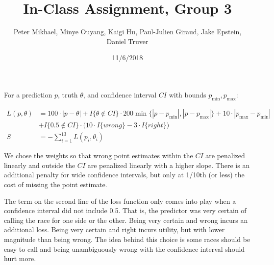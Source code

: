\documentclass[]{article}
\title{In-Class Assignment, Group 3}
\author{Peter Mikhael, Minye Ouyang, Kaigi Hu, Paul-Julien Giraud, Jake Epstein,
Daniel Truver}
\date{11/6/2018}
\begin{document}
\maketitle

For a prediction \(p\), truth \(\theta\), and confidence interval \(CI\)
with bounds \(p_\min, p_\max\):

\[
\begin{aligned}
L(p, \theta) &=
100\cdot|p-\theta| + I\{\theta\notin CI\}\cdot200\min\{|p-p_\min|,|p-p_\max|\} + 10\cdot|p_\max-p_\min|\\& + I\{0.5\notin CI\}\cdot\big(10\cdot I\{wrong\} - 3\cdot I\{right\}\big)  \\
S &= -\sum_{i=1}^{13} L(p_i, \theta_i)
\end{aligned}
\]

We chose the weights so that wrong point estimates within the \(CI\) are
penalized linearly and outside the \(CI\) are penalized linearly with a
higher slope. There is an additional penalty for wide confidence
intervals, but only at 1/10th (or less) the cost of missing the point
estimate.

The term on the second line of the loss function only comes into play
when a confidence interval did not include 0.5. That is, the predictor
was very certain of calling the race for one side or the other. Being
very certain and wrong incurs an additional loss. Being very certain and
right incurs utility, but with lower magnitude than being wrong. The
idea behind this choice is some races should be easy to call and being
unambiguously wrong with the confidence interval should hurt more.
\end{document}
